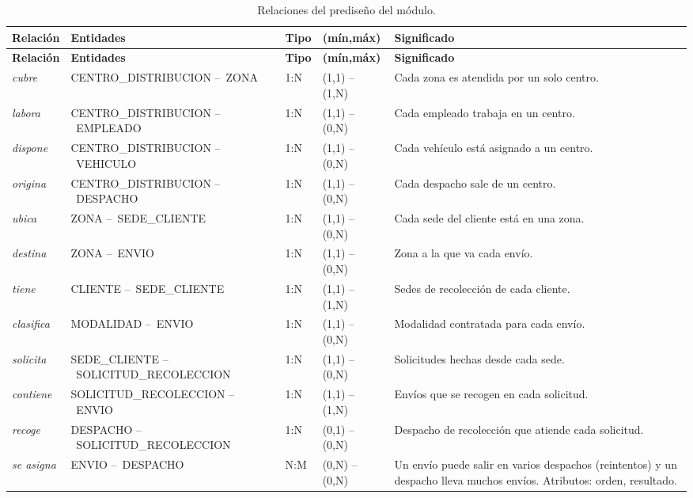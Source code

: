 {\singlespacing\small
\begin{longtable}{L{1.5cm} L{4.9cm} L{0.8cm} L{2.4cm} L{3.9cm}}
\caption{Relaciones del prediseño del módulo.}
\label{tab:relaciones}\\
\toprule
\textbf{Relación} & \textbf{Entidades} & \textbf{Tipo} & \textbf{(mín,máx)} & \textbf{Significado} \\
\midrule
\endfirsthead
\toprule
\textbf{Relación} & \textbf{Entidades} & \textbf{Tipo} & \textbf{(mín,máx)} & \textbf{Significado} \\
\midrule
\endhead
\bottomrule
\endfoot
\textit{cubre} & CENTRO\_DISTRIBUCION --\allowbreak\ ZONA & 1:N & (1,1) -- (1,N) & Cada zona es atendida por un solo centro. \\
\textit{labora} & CENTRO\_DISTRIBUCION --\allowbreak\ EMPLEADO & 1:N & (1,1) -- (0,N) & Cada empleado trabaja en un centro. \\
\textit{dispone} & CENTRO\_DISTRIBUCION --\allowbreak\ VEHICULO & 1:N & (1,1) -- (0,N) & Cada vehículo está asignado a un centro. \\
\textit{origina} & CENTRO\_DISTRIBUCION --\allowbreak\ DESPACHO & 1:N & (1,1) -- (0,N) & Cada despacho sale de un centro. \\
\textit{ubica} & ZONA --\allowbreak\ SEDE\_CLIENTE & 1:N & (1,1) -- (0,N) & Cada sede del cliente está en una zona. \\
\textit{destina} & ZONA --\allowbreak\ ENVIO & 1:N & (1,1) -- (0,N) & Zona a la que va cada envío. \\
\textit{tiene} & CLIENTE --\allowbreak\ SEDE\_CLIENTE & 1:N & (1,1) -- (1,N) & Sedes de recolección de cada cliente. \\
\textit{clasifica} & MODALIDAD --\allowbreak\ ENVIO & 1:N & (1,1) -- (0,N) & Modalidad contratada para cada envío. \\
\textit{solicita} & SEDE\_CLIENTE --\allowbreak\ SOLICITUD\_RECOLECCION & 1:N & (1,1) -- (0,N) & Solicitudes hechas desde cada sede. \\
\textit{contiene} & SOLICITUD\_RECOLECCION --\allowbreak\ ENVIO & 1:N & (1,1) -- (1,N) & Envíos que se recogen en cada solicitud. \\
\textit{recoge} & DESPACHO --\allowbreak\ SOLICITUD\_RECOLECCION & 1:N & (0,1) -- (0,N) & Despacho de recolección que atiende cada solicitud. \\
\textit{se asigna} & ENVIO --\allowbreak\ DESPACHO & N:M & (0,N) -- (0,N) & Un envío puede salir en varios despachos (reintentos) y un despacho lleva muchos envíos. Atributos: orden, resultado. \\

\end{longtable}}
